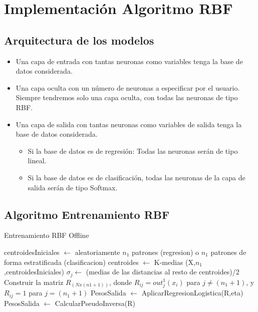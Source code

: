 \section{Implementación Algoritmo RBF}
\subsection{Arquitectura de los modelos}

\begin{itemize}
	\item Una capa de entrada con tantas neuronas como variables tenga la base de datos considerada.
	\item Una capa oculta con un número de neuronas a especificar por el usuario.  Siempre tendremos solo una capa oculta, con todas las neuronas de tipo RBF.
	\item Una capa de salida con tantas neuronas como variables de salida tenga la base de datos considerada.
	\begin{itemize}
		\item Si la base de datos es de regresión: Todas las neuronas serán de tipo lineal.
		\item Si la base de datos es de clasificación, todas las neuronas de la capa de salida serán de tipo Softmax.
	\end{itemize}
\end{itemize}

\subsection{Algoritmo Entrenamiento RBF}
\begin{algorithm}[H]
\caption{Entrenamiento RBF Offline}
\begin{algorithmic}[1]
	\STATE centroidesIniciales $\leftarrow$ aleatoriamente $n_1$ patrones 		     (regresion) o $n_1$ patrones de forma estratificada (clasificacion)
	\STATE centroides $\leftarrow$ K-medias (X,$n_1$,centroidesIniciales)
	\STATE $\sigma_j \leftarrow$ (medias de las distancias al resto de centroides)/2
	\STATE Construir la matriz $R_{(Nx(n1+1))}$, donde $R_{ij} = out_j^1(x_i)$ para $j\neq (n_1 +1)$, y $R_{ij} = 1$ para $j =(n_1 +1)$
		\STATE PesosSalida $\leftarrow$ AplicarRegresionLogistica(R,eta)
	\ELSE
		\STATE PesosSalida $\leftarrow$ CalcularPseudoInversa(R)
	\ENDIF
\end{algorithmic}
\end{algorithm}

